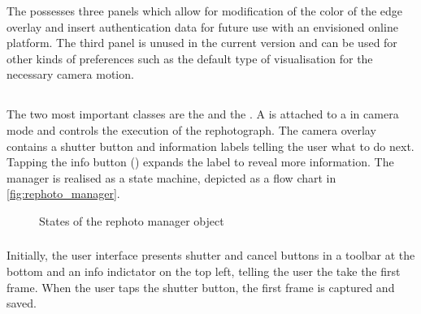 The  possesses three panels which allow for
modification of the color of the edge overlay and insert authentication data for
future use with an envisioned online platform. The third panel is unused in the current
version and can be used for other kinds of preferences such as the default type
of visualisation for the necessary camera motion.


\subsection{}

The two most important classes are the  and the
. A  is attached to
a  in camera mode and controls the execution of
the rephotograph. The camera overlay contains a shutter button and information
labels telling the user what to do next. Tapping the info button
() expands the label
to reveal more information. The manager is realised as a state machine, depicted
as a flow chart in \autoref{fig:rephoto_manager}.

\begin{figure}[h]
   {\centering      
      
      \caption{States of the rephoto manager object}
   \label{fig:rephoto_manager}}
\end{figure}

\subsubsection*{}

Initially, the user interface presents shutter and cancel buttons in a toolbar
at the bottom and an info indictator on the top left, telling the user the take
the first frame. When the user taps the shutter button, the first frame is
captured and saved.

\subsubsection*{}

